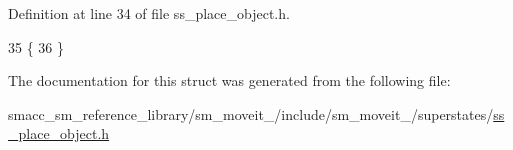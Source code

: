 Definition at line 34 of file ss\+\_\+place\+\_\+object.\+h.


\begin{DoxyCode}
35             \{
36             \}
\end{DoxyCode}


The documentation for this struct was generated from the following file\+:\begin{DoxyCompactItemize}
\item 
smacc\+\_\+sm\+\_\+reference\+\_\+library/sm\+\_\+moveit\+\_/include/sm\+\_\+moveit\+\_/superstates/\hyperlink{4_2include_2sm__moveit__4_2superstates_2ss__place__object_8h}{ss\+\_\+place\+\_\+object.\+h}\end{DoxyCompactItemize}
